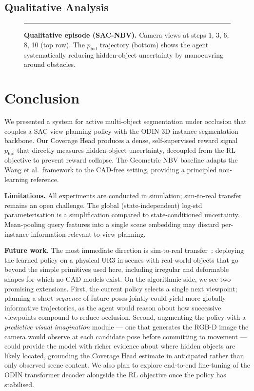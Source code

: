 \documentclass{article}
\newcommand{\phid}{p_{\text{hid}}}
\begin{document}
\subsection{Qualitative Analysis}

\begin{figure}[htbp]
  \centering
  \rule{0.92\textwidth}{5.5cm}   %
  \caption{\textbf{Qualitative episode (SAC-NBV).} Camera views at steps 1, 3, 6, 8, 10 (top row). The $\phid$ trajectory (bottom) shows the agent systematically reducing hidden-object uncertainty by manoeuvring around obstacles.}
  \label{fig:qualitative}
\end{figure}

\FloatBarrier
\section{Conclusion}
\label{sec:conclusion}

We presented a system for active multi-object segmentation under occlusion that couples a SAC view-planning policy with the ODIN 3D instance segmentation backbone. Our Coverage Head produces a dense, self-supervised reward signal $\phid$ that directly measures hidden-object uncertainty, decoupled from the RL objective to prevent reward collapse. The Geometric NBV baseline adapts the Wang et al.\ framework to the CAD-free setting, providing a principled non-learning reference.

\textbf{Limitations.} All experiments are conducted in simulation; sim-to-real transfer~\citep{tobin2017domain,zhao2020sim2real} remains an open challenge. The global (state-independent) log-std parameterisation is a simplification compared to state-conditioned uncertainty. Mean-pooling query features into a single scene embedding may discard per-instance information relevant to view planning.

\textbf{Future work.} The most immediate direction is sim-to-real transfer~\citep{tobin2017domain}: deploying the learned policy on a physical UR3 in scenes with real-world objects that go beyond the simple primitives used here, including irregular and deformable shapes for which no CAD models exist. On the algorithmic side, we see two promising extensions. First, the current policy selects a single next viewpoint; planning a short \emph{sequence} of future poses jointly could yield more globally informative trajectories, as the agent would reason about how successive viewpoints compound to reduce occlusion. Second, augmenting the policy with a \emph{predictive visual imagination} module --- one that generates the RGB-D image the camera would observe at each candidate pose before committing to movement --- could provide the model with richer evidence about where hidden objects are likely located, grounding the Coverage Head estimate in anticipated rather than only observed scene content. We also plan to explore end-to-end fine-tuning of the ODIN transformer decoder alongside the RL objective once the policy has stabilised.
\end{document}
